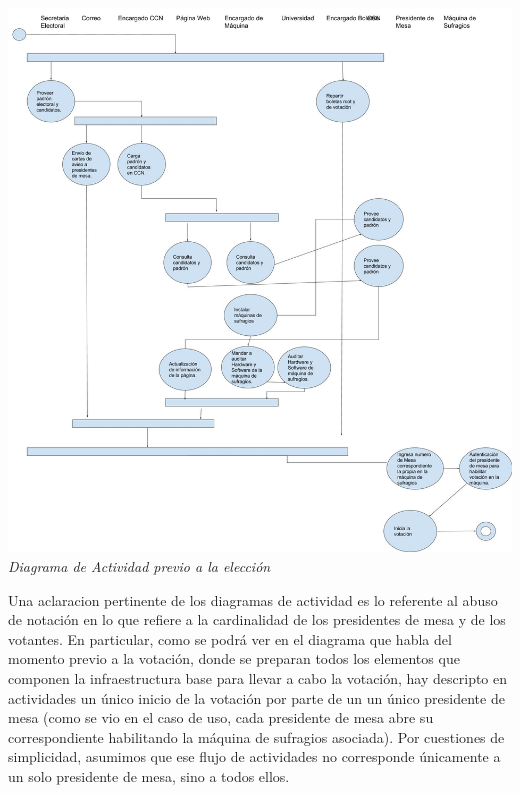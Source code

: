 \documentclass[spanish, 10pt,a4paper]{article}
\numberwithin{equation}{section} %
\begin{document}
\vspace{\baselineskip}
    \begin{center}
                \includegraphics[scale=0.25]{imagenes/actividad/PreVotacion.jpg}
                \\
                \vspace{1pt}
                \footnotesize\textit{Diagrama de Actividad previo a la elección}
        \end{center}
\vspace{\baselineskip}


Una aclaracion pertinente de los diagramas de actividad es lo referente al abuso de notación en lo que refiere a la cardinalidad de los presidentes de mesa y de los votantes. En particular, como se podrá ver en el diagrama que habla del momento previo a la votaci\'on, donde se preparan todos los elementos que componen la infraestructura base para llevar a cabo la votaci\'on, hay descripto en actividades un \'unico inicio de la votaci\'on por parte de un un único presidente de mesa (como se vio en el caso de uso, cada presidente de mesa abre su correspondiente habilitando la m\'aquina de sufragios asociada). Por cuestiones de simplicidad, asumimos que ese flujo de actividades no corresponde únicamente a un solo presidente de mesa, sino a todos ellos.
\end{document}
